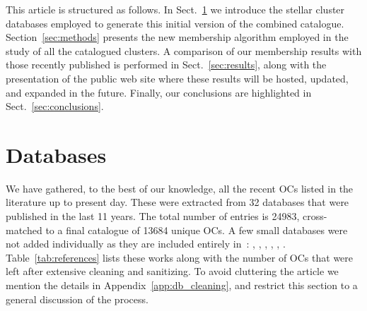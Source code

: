 \documentclass[fleqn,usenatbib]{mnras}
\begin{document}
This article is structured as follows. In Sect.~\ref{sec:databases} we
introduce the stellar cluster databases employed to generate this initial
version of the combined catalogue. Section~\ref{sec:methods} presents the
new membership algorithm employed in the study of all the catalogued clusters.
A comparison of our membership results with those recently published is
performed in Sect.~\ref{sec:results}, along with the presentation of the public
web site where these results will be hosted, updated, and expanded in the future.
Finally, our conclusions are highlighted in Sect.~\ref{sec:conclusions}.


\section{Databases}
\label{sec:databases}

We have gathered, to the best of our knowledge, all the recent OCs listed in
the literature up to present day. These were extracted from 32 databases that
were published in the last 11 years. The total number of entries is 24983,
cross-matched to a final catalogue of 13684 unique OCs.
A few small databases were not added individually as they are included entirely
in~\cite{Hunt_2023}: \cite{Zari_2018}, \cite{Bastian_2019}, \cite{Tian_2020}, 
\cite{Qin_2021}, \cite{Anders_2022}, \cite{Casado_2023}.
%
Table~\ref{tab:references} lists these works along with the number of OCs
that were left after extensive cleaning and sanitizing. To avoid cluttering the
article we mention the details in Appendix~\ref{app:db_cleaning}, and restrict
this section to a general discussion of the process.
\end{document}
